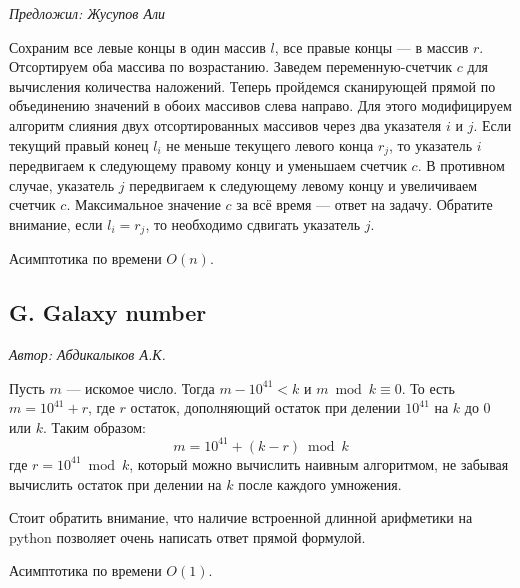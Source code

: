 \documentclass[10pt, a4paper]{article}
\newcommand{\problemauthor}[1]{
\begin{flushright}
\textit{Автор: #1}
\end{flushright}
}
\newcommand{\problemofferer}[1]{
\begin{flushright}
\textit{Предложил: #1}
\end{flushright}
}
\begin{document}
\problemofferer{ Жусупов Али}

Сохраним все левые концы в один массив $l$, все правые концы --- в массив $r$. Отсортируем оба массива по возрастанию. Заведем переменную-счетчик $c$ для вычисления количества наложений. Теперь пройдемся сканирующей прямой по объединению значений в обоих массивов слева направо. Для этого модифицируем алгоритм слияния двух отсортированных массивов через два указателя $i$ и $j$. Если текущий правый конец $l_i$ не меньше текущего левого конца $r_j$, то указатель $i$ передвигаем к следующему правому концу и уменьшаем счетчик $c$. В противном случае, указатель $j$ передвигаем к следующему левому концу и увеличиваем счетчик $c$. Максимальное значение $c$ за всё время --- ответ на задачу. Обратите внимание, если $l_i = r_j$, то необходимо сдвигать указатель $j$.

Асимптотика по времени $O(n)$.






\subsection*{G. Galaxy number}

\problemauthor{ Абдикалыков А.К.}

Пусть $m$ --- искомое число. Тогда $m - 10^{41} < k$ и $m \bmod k \equiv 0$. То есть $m = 10^{41} + r$, где $r$ остаток, дополняющий остаток при делении $10^{41}$ на $k$ до $0$ или $k$. Таким образом:
$$ m = 10^{41} + (k - r) \bmod k$$
где $r = 10^{41} \bmod k$, который можно вычислить наивным алгоритмом, не забывая вычислить остаток при делении на $k$ после каждого умножения.

Стоит обратить внимание, что наличие встроенной длинной арифметики на python позволяет очень написать ответ прямой формулой.

Асимптотика по времени $O(1)$.




\end{document}
